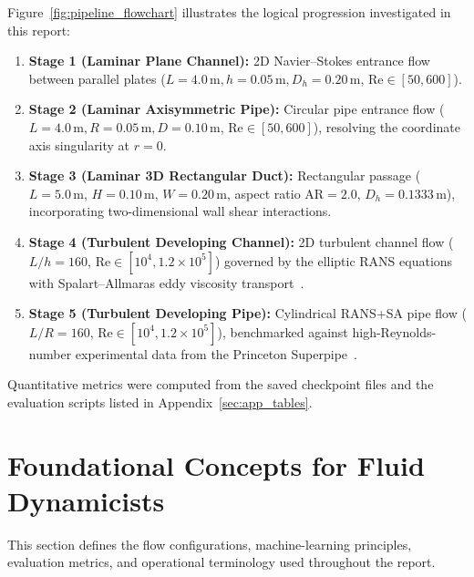 \documentclass[11pt,a4paper]{article}
\begin{document}
Figure~\ref{fig:pipeline_flowchart} illustrates the logical progression investigated in this report:
\begin{enumerate}[leftmargin=2em]
    \item \textbf{Stage 1 (Laminar Plane Channel):} 2D Navier--Stokes entrance flow between parallel plates ($L=4.0\,\text{m}, h=0.05\,\text{m}, D_h=0.20\,\text{m}$, $\mathrm{Re} \in [50, 600]$).
    \item \textbf{Stage 2 (Laminar Axisymmetric Pipe):} Circular pipe entrance flow ($L=4.0\,\text{m}, R=0.05\,\text{m}, D=0.10\,\text{m}$, $\mathrm{Re} \in [50, 600]$), resolving the coordinate axis singularity at $r=0$.
    \item \textbf{Stage 3 (Laminar 3D Rectangular Duct):} Rectangular passage ($L=5.0\,\text{m}$, $H=0.10\,\text{m}$, $W=0.20\,\text{m}$, aspect ratio $\mathrm{AR}=2.0$, $D_h=0.1333\,\text{m}$), incorporating two-dimensional wall shear interactions.
    \item \textbf{Stage 4 (Turbulent Developing Channel):} 2D turbulent channel flow ($L/h = 160$, $\mathrm{Re} \in [10^4, 1.2\times 10^5]$) governed by the elliptic RANS equations with Spalart--Allmaras eddy viscosity transport~\cite[Sec.~2.1, p.~2]{allmaras2012}.
    \item \textbf{Stage 5 (Turbulent Developing Pipe):} Cylindrical RANS+SA pipe flow ($L/R = 160$, $\mathrm{Re} \in [10^4, 1.2\times 10^5]$), benchmarked against high-Reynolds-number experimental data from the Princeton Superpipe~\cite{superpipe_data}.
\end{enumerate}

Quantitative metrics were computed from the saved checkpoint files and the evaluation scripts listed in Appendix~\ref{sec:app_tables}.

\section{Foundational Concepts for Fluid Dynamicists}
\label{sec:foundations}
This section defines the flow configurations, machine-learning principles, evaluation metrics, and operational terminology used throughout the report.
\end{document}
